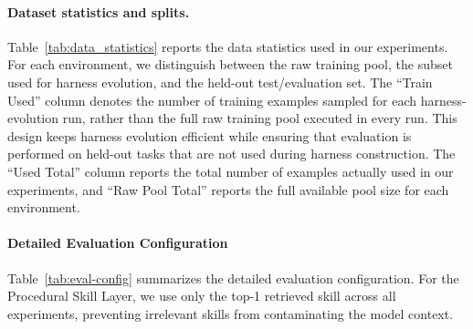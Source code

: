 \paragraph{Dataset statistics and splits.}
Table~\ref{tab:data_statistics} reports the data statistics used in our experiments. 
For each environment, we distinguish between the raw training pool, the subset used for harness evolution, and the held-out test/evaluation set. 
The ``Train Used'' column denotes the number of training examples sampled for each harness-evolution run, rather than the full raw training pool executed in every run. 
This design keeps harness evolution efficient while ensuring that evaluation is performed on held-out tasks that are not used during harness construction. 
The ``Used Total'' column reports the total number of examples actually used in our experiments, and ``Raw Pool Total'' reports the full available pool size for each environment.

\paragraph{Detailed Evaluation Configuration}
Table~\ref{tab:eval-config} summarizes the detailed evaluation configuration. For the Procedural Skill Layer, we use only the top-1 retrieved skill across all experiments, preventing irrelevant skills from contaminating the model context.

